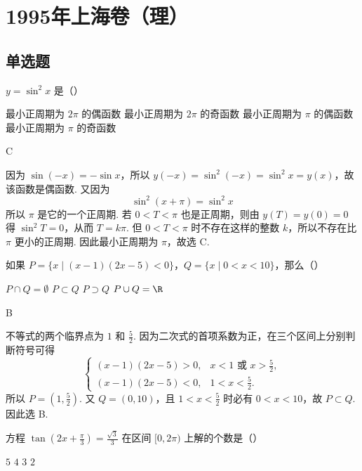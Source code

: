 \chapter{1995年上海卷（理）}
\section{单选题}

\begin{problem}
\(y=\sin^2 x\) 是（\quad）

\choices
    {最小正周期为 \(2\pi\) 的偶函数}
    {最小正周期为 \(2\pi\) 的奇函数}
    {最小正周期为 \(\pi\) 的偶函数}
    {最小正周期为 \(\pi\) 的奇函数}
\end{problem}

\begin{answer}
C
\end{answer}

\begin{solution}
因为 \(\sin(-x)=-\sin x\)，所以 \(y(-x)=\sin^2(-x)=\sin^2x=y(x)\)，故该函数是偶函数. 又因为
\[
\sin^2(x+\pi)=\sin^2x
\]
所以 \(\pi\) 是它的一个正周期. 若 \(0<T<\pi\) 也是正周期，则由 \(y(T)=y(0)=0\) 得 \(\sin^2T=0\)，从而 \(T=k\pi\). 但 \(0<T<\pi\) 时不存在这样的整数 \(k\)，所以不存在比 \(\pi\) 更小的正周期. 因此最小正周期为 \(\pi\)，故选 C.
\end{solution}

\begin{problem}
如果 \(P=\{x\mid (x-1)(2x-5)<0\}\)，\(Q=\{x\mid 0<x<10\}\)，那么（\quad）

\choices
    {\(P\cap Q=\emptyset\)}
    {\(P\subset Q\)}
    {\(P\supset Q\)}
    {\(P\cup Q=\R\)}
\end{problem}

\begin{answer}
B
\end{answer}

\begin{solution}
不等式的两个临界点为 \(1\) 和 \(\frac{5}{2}\). 因为二次式的首项系数为正，在三个区间上分别判断符号可得
\[
\begin{cases}
(x-1)(2x-5)>0,&x<1\text{ 或 }x>\frac52,\\
(x-1)(2x-5)<0,&1<x<\frac52.
\end{cases}
\]
所以 \(P=\left(1,\frac{5}{2}\right)\). 又 \(Q=(0,10)\)，且 \(1<x<\frac52\) 时必有 \(0<x<10\)，故 \(P\subset Q\). 因此选 B.
\end{solution}

\begin{problem}
方程 \(\tan\left(2x+\frac{\pi}{3}\right)=\frac{\sqrt{3}}{3}\) 在区间 \([0,2\pi)\) 上解的个数是（\quad）

\choices
    {\(5\)}
    {\(4\)}
    {\(3\)}
    {\(2\)}
\end{problem}

